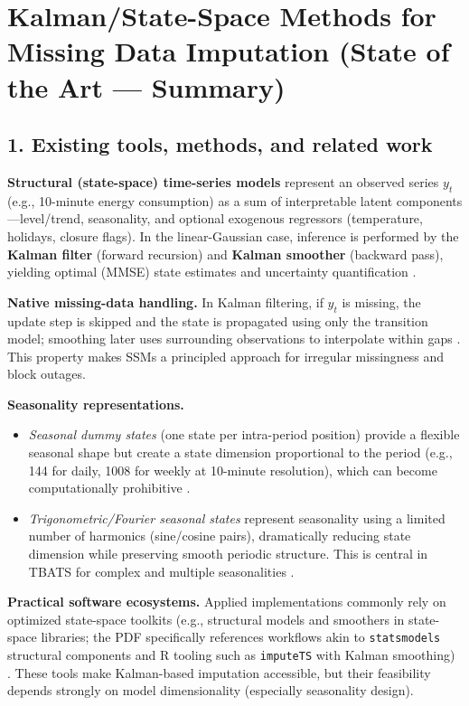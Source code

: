 \section*{Kalman/State-Space Methods for Missing Data Imputation (State of the Art --- Summary)}

\subsection*{1. Existing tools, methods, and related work}
\textbf{Structural (state-space) time-series models} represent an observed series $y_t$ (e.g., 10-minute energy consumption) as a sum of interpretable latent components---level/trend, seasonality, and optional exogenous regressors (temperature, holidays, closure flags). In the linear-Gaussian case, inference is performed by the \textbf{Kalman filter} (forward recursion) and \textbf{Kalman smoother} (backward pass), yielding optimal (MMSE) state estimates and uncertainty quantification \cite{durbin2012,harvey1989}.

\textbf{Native missing-data handling.} In Kalman filtering, if $y_t$ is missing, the update step is skipped and the state is propagated using only the transition model; smoothing later uses surrounding observations to interpolate within gaps \cite{durbin2012}. This property makes SSMs a principled approach for irregular missingness and block outages.

\textbf{Seasonality representations.}
\begin{itemize}
\item \textit{Seasonal dummy states} (one state per intra-period position) provide a flexible seasonal shape but create a state dimension proportional to the period (e.g., 144 for daily, 1008 for weekly at 10-minute resolution), which can become computationally prohibitive \cite{durbin2012,harvey1989}.
\item \textit{Trigonometric/Fourier seasonal states} represent seasonality using a limited number of harmonics (sine/cosine pairs), dramatically reducing state dimension while preserving smooth periodic structure. This is central in TBATS for complex and multiple seasonalities \cite{delivera2011}.
\end{itemize}

\textbf{Practical software ecosystems.} Applied implementations commonly rely on optimized state-space toolkits (e.g., structural models and smoothers in state-space libraries; the PDF specifically references workflows akin to \texttt{statsmodels} structural components and R tooling such as \texttt{imputeTS} with Kalman smoothing) \cite{moritz2017}. These tools make Kalman-based imputation accessible, but their feasibility depends strongly on model dimensionality (especially seasonality design).

